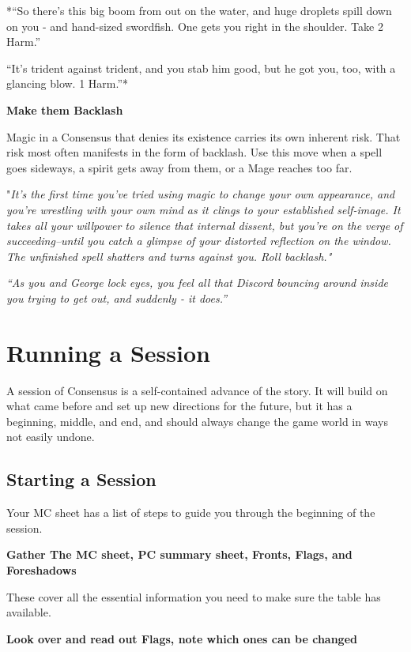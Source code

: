 \documentclass[
]{memoir}
\begin{document}
*``So there's this big boom from out on the water, and huge droplets
spill down on you - and hand-sized swordfish. One gets you right in the
shoulder. Take 2 Harm.''

``It's trident against trident, and you stab him good, but he got you,
too, with a glancing blow. 1 Harm.''*

\textbf{Make them Backlash}

Magic in a Consensus that denies its existence carries its own inherent
risk. That risk most often manifests in the form of backlash. Use this
move when a spell goes sideways, a spirit gets away from them, or a Mage
reaches too far.

"\emph{It's the first time you've tried using magic to change your own
appearance, and you're wrestling with your own mind as it clings to your
established self-image. It takes all your willpower to silence that
internal dissent, but you're on the verge of succeeding--until you catch
a glimpse of your distorted reflection on the window. The unfinished
spell shatters and turns against you. Roll backlash."}

\emph{``As you and George lock eyes, you feel all that Discord bouncing
around inside you trying to get out, and suddenly - it does.''}

\hypertarget{running-a-session}{%
\section{Running a Session}\label{running-a-session}}

A session of Consensus is a self-contained advance of the story. It will
build on what came before and set up new directions for the future, but
it has a beginning, middle, and end, and should always change the game
world in ways not easily undone.

\hypertarget{starting-a-session}{%
\subsection{Starting a Session}\label{starting-a-session}}

Your MC sheet has a list of steps to guide you through the beginning of
the session.

\textbf{Gather The MC sheet, PC summary sheet, Fronts, Flags, and
Foreshadows}

These cover all the essential information you need to make sure the
table has available.

\textbf{Look over and read out Flags, note which ones can be changed}
\end{document}
